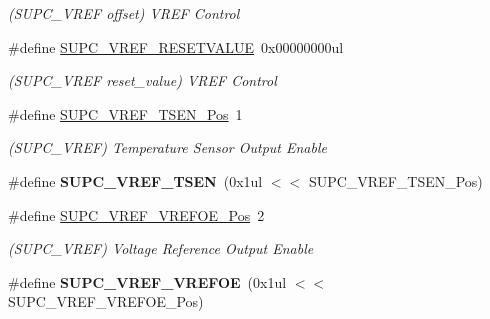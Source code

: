 \begin{DoxyCompactItemize}
\begin{DoxyCompactList}\small\item\em (S\+U\+P\+C\+\_\+\+V\+R\+E\+F offset) V\+R\+E\+F Control \end{DoxyCompactList}\item 
\hypertarget{group___s_a_m_l21___s_u_p_c_gaa872fab9aa218e3779ff6946e8600c67}{}\#define \hyperlink{group___s_a_m_l21___s_u_p_c_gaa872fab9aa218e3779ff6946e8600c67}{S\+U\+P\+C\+\_\+\+V\+R\+E\+F\+\_\+\+R\+E\+S\+E\+T\+V\+A\+L\+U\+E}~0x00000000ul\label{group___s_a_m_l21___s_u_p_c_gaa872fab9aa218e3779ff6946e8600c67}

\begin{DoxyCompactList}\small\item\em (S\+U\+P\+C\+\_\+\+V\+R\+E\+F reset\+\_\+value) V\+R\+E\+F Control \end{DoxyCompactList}\item 
\hypertarget{group___s_a_m_l21___s_u_p_c_ga4f95de0a40088162ff965e5f256f0346}{}\#define \hyperlink{group___s_a_m_l21___s_u_p_c_ga4f95de0a40088162ff965e5f256f0346}{S\+U\+P\+C\+\_\+\+V\+R\+E\+F\+\_\+\+T\+S\+E\+N\+\_\+\+Pos}~1\label{group___s_a_m_l21___s_u_p_c_ga4f95de0a40088162ff965e5f256f0346}

\begin{DoxyCompactList}\small\item\em (S\+U\+P\+C\+\_\+\+V\+R\+E\+F) Temperature Sensor Output Enable \end{DoxyCompactList}\item 
\hypertarget{group___s_a_m_l21___s_u_p_c_ga4a892d3233a220f8c3f6e9fea82eb936}{}\#define {\bfseries S\+U\+P\+C\+\_\+\+V\+R\+E\+F\+\_\+\+T\+S\+E\+N}~(0x1ul $<$$<$ S\+U\+P\+C\+\_\+\+V\+R\+E\+F\+\_\+\+T\+S\+E\+N\+\_\+\+Pos)\label{group___s_a_m_l21___s_u_p_c_ga4a892d3233a220f8c3f6e9fea82eb936}

\item 
\hypertarget{group___s_a_m_l21___s_u_p_c_ga80ad3fd2d67f85d288df7d2f3a814e17}{}\#define \hyperlink{group___s_a_m_l21___s_u_p_c_ga80ad3fd2d67f85d288df7d2f3a814e17}{S\+U\+P\+C\+\_\+\+V\+R\+E\+F\+\_\+\+V\+R\+E\+F\+O\+E\+\_\+\+Pos}~2\label{group___s_a_m_l21___s_u_p_c_ga80ad3fd2d67f85d288df7d2f3a814e17}

\begin{DoxyCompactList}\small\item\em (S\+U\+P\+C\+\_\+\+V\+R\+E\+F) Voltage Reference Output Enable \end{DoxyCompactList}\item 
\hypertarget{group___s_a_m_l21___s_u_p_c_ga70c3ea52ac7e7244a7f3a6963ef218ba}{}\#define {\bfseries S\+U\+P\+C\+\_\+\+V\+R\+E\+F\+\_\+\+V\+R\+E\+F\+O\+E}~(0x1ul $<$$<$ S\+U\+P\+C\+\_\+\+V\+R\+E\+F\+\_\+\+V\+R\+E\+F\+O\+E\+\_\+\+Pos)\label{group___s_a_m_l21___s_u_p_c_ga70c3ea52ac7e7244a7f3a6963ef218ba}


\end{DoxyCompactItemize}
